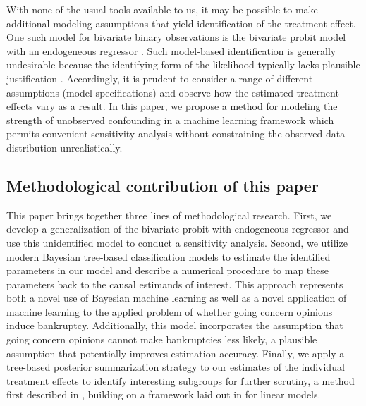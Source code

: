 \documentclass[aoas,preprint, 11pt, dvipsnames, table, x11name]{imsart}
\theoremstyle{remark}
\begin{document}
With none of the usual tools available to us, it may be possible to make additional modeling assumptions that yield identification of the treatment effect. One such model for bivariate binary observations is the bivariate probit model with an endogeneous regressor \citep[Section~ 15.7.3]{Wooldridge-2010}. Such model-based identification is generally undesirable because the identifying form of the likelihood typically lacks plausible justification \citep{Manski}. Accordingly, it is prudent to consider a range of different assumptions (model specifications) and observe how the estimated treatment effects vary as a result. In this paper, we propose a method for modeling the strength of unobserved confounding in a machine learning framework which permits convenient sensitivity analysis without constraining the observed data distribution unrealistically.

\subsection{Methodological contribution of this paper}
This paper brings together three lines of methodological research. First, we develop a generalization of the bivariate probit with endogeneous regressor and use this unidentified model to conduct a sensitivity analysis. Second, we utilize modern Bayesian tree-based classification models to estimate the identified parameters in our model and describe a numerical procedure to map these parameters back to the causal estimands of interest. This approach represents both a novel use of Bayesian machine learning as well as a novel application of machine learning to the applied problem of whether going concern opinions induce bankruptcy. Additionally, this model incorporates the assumption that going concern opinions cannot make bankruptcies less likely, a plausible assumption that potentially improves estimation accuracy. Finally, we apply a tree-based posterior summarization strategy to our estimates of the individual treatment effects to identify interesting subgroups for further scrutiny, a method first described in \cite{bcf}, building on a framework laid out in \cite{Hahn-2015} for linear models.
\end{document}
